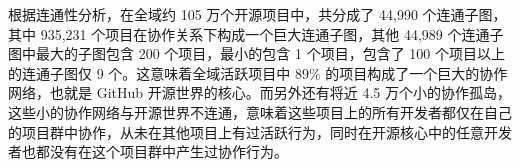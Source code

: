\par 根据连通性分析，在全域约 105 万个开源项目中，共分成了 44,990 个连通子图，其中 935,231 个项目在协作关系下构成一个巨大连通子图，其他 44,989 个连通子图中最大的子图包含 200 个项目，最小的包含 1 个项目，包含了 100 个项目以上的连通子图仅 9 个。这意味着全域活跃项目中 89\% 的项目构成了一个巨大的协作网络，也就是 GitHub 开源世界的核心。而另外还有将近 4.5 万个小的协作孤岛，这些小的协作网络与开源世界不连通，意味着这些项目上的所有开发者都仅在自己的项目群中协作，从未在其他项目上有过活跃行为，同时在开源核心中的任意开发者也都没有在这个项目群中产生过协作行为。


